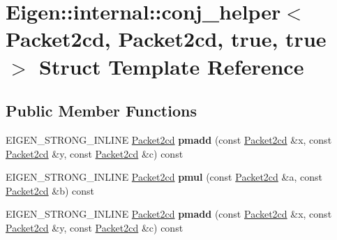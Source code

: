 \hypertarget{struct_eigen_1_1internal_1_1conj__helper_3_01_packet2cd_00_01_packet2cd_00_01true_00_01true_01_4}{}\section{Eigen\+:\+:internal\+:\+:conj\+\_\+helper$<$ Packet2cd, Packet2cd, true, true $>$ Struct Template Reference}
\label{struct_eigen_1_1internal_1_1conj__helper_3_01_packet2cd_00_01_packet2cd_00_01true_00_01true_01_4}
\subsection*{Public Member Functions}
\begin{DoxyCompactItemize}
\item 
\mbox{\label{struct_eigen_1_1internal_1_1conj__helper_3_01_packet2cd_00_01_packet2cd_00_01true_00_01true_01_4_a35755e54de7413497048b98f2ea64fea}} 
E\+I\+G\+E\+N\+\_\+\+S\+T\+R\+O\+N\+G\+\_\+\+I\+N\+L\+I\+NE \hyperlink{struct_eigen_1_1internal_1_1_packet2cd}{Packet2cd} {\bfseries pmadd} (const \hyperlink{struct_eigen_1_1internal_1_1_packet2cd}{Packet2cd} \&x, const \hyperlink{struct_eigen_1_1internal_1_1_packet2cd}{Packet2cd} \&y, const \hyperlink{struct_eigen_1_1internal_1_1_packet2cd}{Packet2cd} \&c) const
\item 
\mbox{\label{struct_eigen_1_1internal_1_1conj__helper_3_01_packet2cd_00_01_packet2cd_00_01true_00_01true_01_4_a9fff571edb209bb981023c4a117baf00}} 
E\+I\+G\+E\+N\+\_\+\+S\+T\+R\+O\+N\+G\+\_\+\+I\+N\+L\+I\+NE \hyperlink{struct_eigen_1_1internal_1_1_packet2cd}{Packet2cd} {\bfseries pmul} (const \hyperlink{struct_eigen_1_1internal_1_1_packet2cd}{Packet2cd} \&a, const \hyperlink{struct_eigen_1_1internal_1_1_packet2cd}{Packet2cd} \&b) const
\item 
\mbox{\label{struct_eigen_1_1internal_1_1conj__helper_3_01_packet2cd_00_01_packet2cd_00_01true_00_01true_01_4_a35755e54de7413497048b98f2ea64fea}} 
E\+I\+G\+E\+N\+\_\+\+S\+T\+R\+O\+N\+G\+\_\+\+I\+N\+L\+I\+NE \hyperlink{struct_eigen_1_1internal_1_1_packet2cd}{Packet2cd} {\bfseries pmadd} (const \hyperlink{struct_eigen_1_1internal_1_1_packet2cd}{Packet2cd} \&x, const \hyperlink{struct_eigen_1_1internal_1_1_packet2cd}{Packet2cd} \&y, const \hyperlink{struct_eigen_1_1internal_1_1_packet2cd}{Packet2cd} \&c) const

\end{DoxyCompactItemize}
